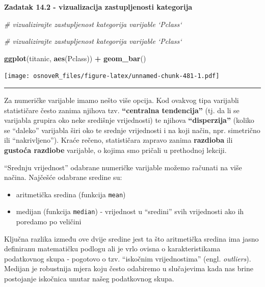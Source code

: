 \documentclass[]{book}
\newenvironment{Shaded}{\begin{snugshade}}{\end{snugshade}}
\newcommand{\KeywordTok}[1]{\textcolor[rgb]{0.13,0.29,0.53}{\textbf{#1}}}
\newcommand{\StringTok}[1]{\textcolor[rgb]{0.31,0.60,0.02}{#1}}
\newcommand{\CommentTok}[1]{\textcolor[rgb]{0.56,0.35,0.01}{\textit{#1}}}
\newcommand{\OperatorTok}[1]{\textcolor[rgb]{0.81,0.36,0.00}{\textbf{#1}}}
\newcommand{\NormalTok}[1]{#1}
\providecommand{\tightlist}{%
  \setlength{\itemsep}{0pt}\setlength{\parskip}{0pt}}
\theoremstyle{definition}
\theoremstyle{definition}
\theoremstyle{definition}
\theoremstyle{remark}
\begin{document}
\textbf{Zadatak 14.2 - vizualizacija zastupljenosti kategorija}

\begin{Shaded}
\begin{Highlighting}[]
\CommentTok{# vizualizirajte zastupljenost kategorija varijable `Pclass`}
\end{Highlighting}
\end{Shaded}

\begin{Shaded}
\begin{Highlighting}[]
\CommentTok{# vizualizirajte zastupljenost kategorija varijable `Pclass`}

\KeywordTok{ggplot}\NormalTok{(titanic, }\KeywordTok{aes}\NormalTok{(Pclass)) }\OperatorTok{+}\StringTok{ }\KeywordTok{geom_bar}\NormalTok{()}
\end{Highlighting}
\end{Shaded}

\texttt{[image: osnoveR\_files/figure-latex/unnamed-chunk-481-1.pdf]}

\begin{center}\rule{0.5\linewidth}{\linethickness}\end{center}

Za numeričke varijable imamo nešto više opcija. Kod ovakvog tipa
varijabli statističare često zanima njihova tzv. \textbf{``centralna
tendencija''} (tj. da li se varijabla grupira oko neke središnje
vrijednosti) te njihova \textbf{``disperzija''} (koliko se ``daleko''
varijabla širi oko te srednje vrijednosti i na koji način, npr.
simetrično ili ``nakrivljeno''). Kraće rečeno, statističara zapravo
zanima \textbf{razdioba} ili \textbf{gustoća razdiobe} varijable, o
kojima smo pričali u prethodnoj lekciji.

``Srednju vrijednost'' odabrane numeričke varijable možemo računati na
više načina. Najčešće odabrane sredine su:

\begin{itemize}
\tightlist
\item
  aritmetička sredina (funkcija \texttt{mean})
\item
  medijan (funkcija \texttt{median}) - vrijednost u ``sredini'' svih
  vrijednosti ako ih poredamo po veličini
\end{itemize}

Ključna razlika između ove dvije sredine jest ta što aritmetička sredina
ima jasno definiranu matematičku podlogu ali je vrlo ovisna o
karakteristikama podatkovnog skupa - pogotovo o tzv. ``iskočnim
vrijednostima'' (engl. \emph{outliers}). Medijan je robustnija mjera
koju često odabiremo u slučajevima kada nas brine postojanje iskočnica
unutar našeg podatkovnog skupa.
\end{document}
